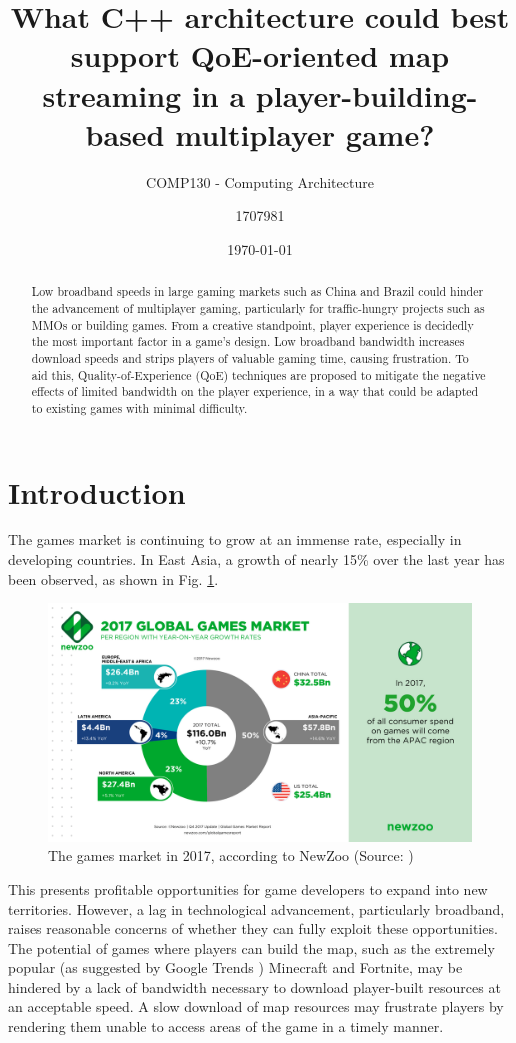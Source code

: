 \documentclass{scrartcl}
\title{What C++ architecture could best support QoE-oriented map streaming in a player-building-based multiplayer game?}
\subtitle{COMP130 - Computing Architecture}
\date{\today}
\author{1707981}
\begin{document}
\maketitle
{}

\begin{abstract}
Low broadband speeds in large gaming markets such as China and Brazil could hinder the advancement of multiplayer gaming, particularly for traffic-hungry projects such as MMOs or building games. From a creative standpoint, player experience is decidedly the most important factor in a game's design. Low broadband bandwidth increases download speeds and strips players of valuable gaming time, causing frustration. To aid this, Quality-of-Experience (QoE) techniques are proposed to mitigate the negative effects of limited bandwidth on the player experience, in a way that could be adapted to existing games with minimal difficulty.
\end{abstract}

\section{Introduction}
The games market is continuing to grow at an immense rate, especially in developing countries. In East Asia, a growth of nearly 15\% over the last year has been observed, as shown in Fig. \ref{fig:market}.

\begin{figure}[H]
	\includegraphics[width=0.75\linewidth]{Newzoo_2017_Global_Games_Market.png}
	\caption{The games market in 2017, according to NewZoo (Source: \cite{globalmarketpic})}
	\label{fig:market}
\end{figure}

This presents profitable opportunities for game developers to expand into new territories. However, a lag in technological advancement, particularly broadband, raises reasonable concerns of whether they can fully exploit these opportunities. The potential of games where players can build the map, such as the extremely popular (as suggested by Google Trends \cite{minecraftnite}) Minecraft and Fortnite, may be hindered by a lack of bandwidth necessary to download player-built resources at an acceptable speed. A slow download of map resources may frustrate players by rendering them unable to access areas of the game in a timely manner.
\end{document}
